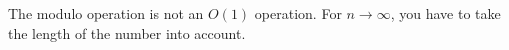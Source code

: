 The modulo operation is not an $O(1)$ operation. For
$n\rightarrow\infty$, you have to take the length of the number into
account.
